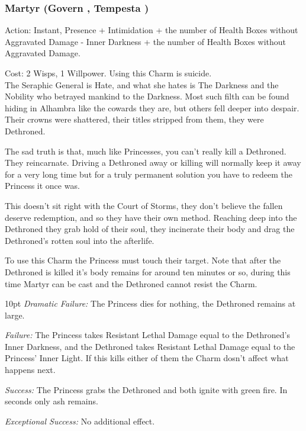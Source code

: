 \subsubsection*{Martyr (Govern \textbullet\textbullet\textbullet\textbullet\textbullet, Tempesta \textbullet\textbullet\textbullet\textbullet)}

\noindent Action: Instant, Presence + Intimidation + the number of Health Boxes without Aggravated Damage - Inner Darkness + the number of Health Boxes without Aggravated Damage.

\noindent Cost: 2 Wisps, 1 Willpower. Using this Charm is suicide. \\

\noindent The Seraphic General is Hate, and what she hates is The Darkness and the Nobility who betrayed mankind to the Darkness. Most such filth can be found hiding in Alhambra like the cowards they are, but others fell deeper into despair. Their crowns were shattered, their titles stripped from them, they were Dethroned. 

The sad truth is that, much like Princesses, you can't really kill a Dethroned. They reincarnate. Driving a Dethroned away or killing will normally keep it away for a very long time but for a truly permanent solution you have to redeem the Princess it once was. 

This doesn’t sit right with the Court of Storms, they don't believe the fallen deserve redemption, and so they have their own method. Reaching deep into the Dethroned they grab hold of their soul, they incinerate their body and drag the Dethroned's rotten soul into the afterlife.

To use this Charm the Princess must touch their target. Note that after the Dethroned is killed it's body remains for around ten minutes or so, during this time Martyr can be cast and the Dethroned cannot resist the Charm. 

\begin{myindentpar}{10pt} \emph{Dramatic Failure:} The Princess dies for nothing, the Dethroned remains at large. 

    \emph{Failure:} The Princess takes Resistant Lethal Damage equal to the Dethroned's Inner Darkness, and the Dethroned takes Resistant Lethal Damage equal to the Princess' Inner Light. If this kills either of them the Charm dosn't affect what happens next. 

    \emph{Success:} The Princess grabs the Dethroned and both ignite with green fire. In seconds only ash remains. 

    \emph{Exceptional Success:} No additional effect.\end{myindentpar} 

